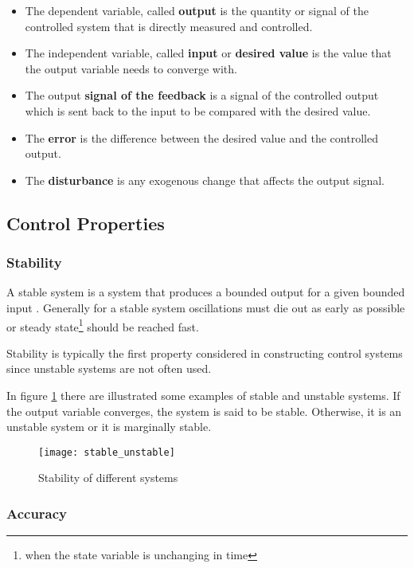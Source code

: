 \begin{itemize}
\item The dependent variable, called \textbf{output} is  the quantity or signal of the controlled system that is directly measured and controlled.
\item The independent variable, called \textbf{input} or \textbf{desired value} is the value that the output variable needs to converge with.
\item The output \textbf{signal of the feedback} is a signal of the controlled output which is sent back to the input to be compared with the desired value.
\item The \textbf{error}  is the difference between the desired value and the controlled output.
\item The \textbf{disturbance} is any exogenous change that affects the output signal.
\end{itemize}

\subsection{Control Properties}

\subsubsection*{Stability}
A stable system is a system that produces a bounded
output for a given bounded input \cite{dorf2011modern}. Generally for a stable system oscillations must die out as early as possible or steady state\footnote{when the state variable is unchanging in time} should be reached fast.

Stability is typically the first property considered in constructing control systems since unstable systems are not often used.

In figure \ref{fig:stable_unstable} there are illustrated some examples of stable and unstable systems. 
If the output variable converges, the system is said to be stable. Otherwise, it is an unstable system or it is marginally stable.

\begin{figure}[H]
    \centering
    \texttt{[image: stable\_unstable]}
    \caption{Stability of different systems \cite{stability}}
    \label{fig:stable_unstable}
\end{figure}

\subsubsection*{Accuracy}

